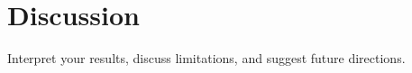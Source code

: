 \section{Discussion}
\label{sec:discussion}

Interpret your results, discuss limitations, and suggest future directions.

